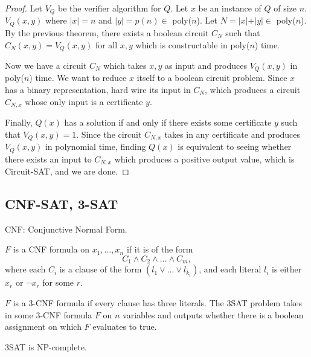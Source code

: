 \begin{proof}
Let $V_Q$ be the verifier algorithm for $Q$. Let $x$ be an instance of $Q$ of size $n$. $V_Q(x,y)$ where $\vert x\vert = n$ and $\vert y\vert = p(n)\in$ poly($n$). Let $N = \vert x\vert + \vert y \vert \in$ poly($n$). By the previous theorem, there exists a boolean circuit $C_N$ such that $C_N(x,y) = V_Q(x,y)$ for all $x,y$ which is constructable in poly($n$) time.

Now we have a circuit $C_N$ which takes $x,y$ as input and produces $V_Q(x,y)$ in poly($n$) time. We want to reduce $x$ itself to a boolean circuit problem. Since $x$ has a binary representation, hard wire its input in $C_N$, which produces a circuit $C_{N,x}$ whose only input is a certificate $y$. 

Finally, $Q(x)$ has a solution if and only if there exists some certificate $y$ such that $V_Q(x,y)=1$. Since the circuit $C_{N,x}$ takes in any certificate and produces $V_Q(x,y)$ in polynomial time, finding $Q(x)$ is equivalent to seeing whether there exists an input to $C_{N,x}$ which produces a positive output value, which is Circuit-SAT, and we are done.
\end{proof}

\subsection{CNF-SAT, 3-SAT}

CNF: Conjunctive Normal Form. 

\begin{definition}

$F$ is a CNF formula on $x_1, \hdots, x_n$ if it is of the form
\[C_1\wedge C_2\wedge \hdots \wedge C_m,\]
where each $C_i$ is a \ac{clause} of the form $(l_1\vee \hdots \vee l_{k_i})$, and each \ac{literal} $l_i$ is either $x_r$ or $\neg x_r$ for some $r$. 
\end{definition}

$F$ is a 3-CNF formula if every clause has three literals. The 3SAT problem takes in some $3$-CNF formula $F$ on $n$ variables and outputs whether there is a boolean assignment on which $F$ evaluates to true. 

\begin{theorem}
\thmlabel

$3$SAT is NP-complete. 
\end{theorem}

